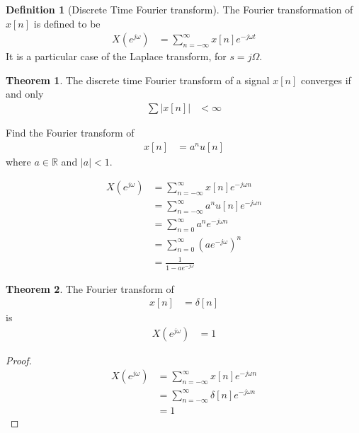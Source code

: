 \documentclass[titlepage, fleqn, a4paper, 12pt, twoside]{article}
\theoremstyle{definition}
\newtheorem{definition}{Definition}
\theoremstyle{theorem}
\newtheorem{theorem}{Theorem}
\begin{document}
\begin{definition}[Discrete Time Fourier transform]
	The Fourier transformation of $x[n]$ is defined to be
	\begin{align*}
		X\left( e^{j \omega} \right) &= \sum\limits_{n = -\infty}^{\infty} x[n] e^{-j \omega t}
	\end{align*}
	It is a particular case of the Laplace transform, for $s = j \Omega$.
\end{definition}

\begin{theorem}
	The discrete time Fourier transform of a signal $x[n]$ converges if and only
	\begin{align*}
		\sum \left| x[n] \right| &< \infty
	\end{align*}
\end{theorem}

\begin{question}
	Find the Fourier transform of
	\begin{align*}
		x[n] &= a^n u[n]
	\end{align*}
	where $a \in \mathbb{R}$ and $|a| < 1$.
\end{question}

\begin{solution}
	\begin{align*}
		X\left( e^{j \omega} \right) &= \sum\limits_{n = -\infty}^{\infty} x[n] e^{-j \omega n}\\
		&= \sum\limits_{n = -\infty}^{\infty} a^n u[n] e^{-j \omega n}\\
		&= \sum\limits_{n = 0}^{\infty} a^n e^{-j \omega n}\\
		&= \sum\limits_{n = 0}^{\infty} \left( a e^{-j \omega} \right)^n\\
		&= \frac{1}{1 - a e^{-j \omega}}
	\end{align*}
\end{solution}

\begin{theorem}
	The Fourier transform of
	\begin{align*}
		x[n] &= \delta[n]
	\end{align*}
	is
	\begin{align*}
		X\left( e^{j \omega} \right) &= 1
	\end{align*}
\end{theorem}

\begin{proof}
	\begin{align*}
		X\left( e^{j \omega} \right) &= \sum\limits_{n = -\infty}^{\infty} x[n] e^{-j \omega n}\\
		&= \sum\limits_{n = -\infty}^{\infty} \delta[n] e^{-j \omega n}\\
		&= 1
	\end{align*}
\end{proof}
\end{document}
